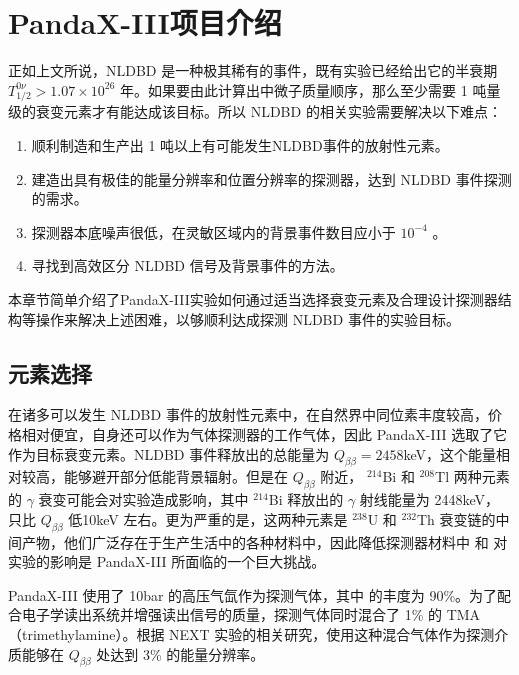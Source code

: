 \chapter{PandaX-III项目介绍}
\label{chapter:intro}

正如上文所说，NLDBD 是一种极其稀有的事件，既有实验已经给出它的半衰期 $T^{0\nu}_{1/2}>1.07\times10^{26}$ 年。如果要由此计算出中微子质量顺序，那么至少需要 1 吨量级的衰变元素才有能达成该目标。所以 NLDBD 的相关实验需要解决以下难点：

\vspace{0.4cm}
\begin{enumerate}
    \item 顺利制造和生产出 1 吨以上有可能发生NLDBD事件的放射性元素。
    \item 建造出具有极佳的能量分辨率和位置分辨率的探测器，达到 NLDBD 事件探测的需求。
    \item 探测器本底噪声很低，在灵敏区域内的背景事件数目应小于 $10^{-4}$ \ckky。
    \item 寻找到高效区分 NLDBD 信号及背景事件的方法。
\end{enumerate}
\vspace{0.4cm}

本章节简单介绍了PandaX-III实验如何通过适当选择衰变元素及合理设计探测器结构等操作来解决上述困难，以够顺利达成探测 NLDBD 事件的实验目标。

\section{元素选择}

在诸多可以发生 NLDBD 事件的放射性元素中，\xeots 在自然界中同位素丰度较高，价格相对便宜，自身还可以作为气体探测器的工作气体，因此 PandaX-III 选取了它作为目标衰变元素。\xeots NLDBD 事件释放出的总能量为 $Q_{\beta\beta}=2458$keV，这个能量相对较高，能够避开部分低能背景辐射。但是在 $Q_{\beta\beta}$ 附近， $^{214}$Bi 和 $^{208}$Tl 两种元素的 $\gamma$ 衰变可能会对实验造成影响，其中 $^{214}$Bi 释放出的 $\gamma$ 射线能量为 2448keV，只比 $Q_{\beta\beta}$ 低10keV 左右。更为严重的是，这两种元素是 $^{238}$U 和 $^{232}$Th 衰变链的中间产物，他们广泛存在于生产生活中的各种材料中，因此降低探测器材料中 \utte 和 \thttt 对实验的影响是 PandaX-III 所面临的一个巨大挑战。

PandaX-III 使用了 10bar 的高压气氙作为探测气体，其中 \xeots 的丰度为 90\%。为了配合电子学读出系统并增强读出信号的质量，探测气体同时混合了 1\% 的 TMA（trimethylamine）。根据 NEXT 实验的相关研究，使用这种混合气体作为探测介质能够在 $Q_{\beta\beta}$ 处达到 3\% 的能量分辨率\supercite{azevedoh2015accurate}。

